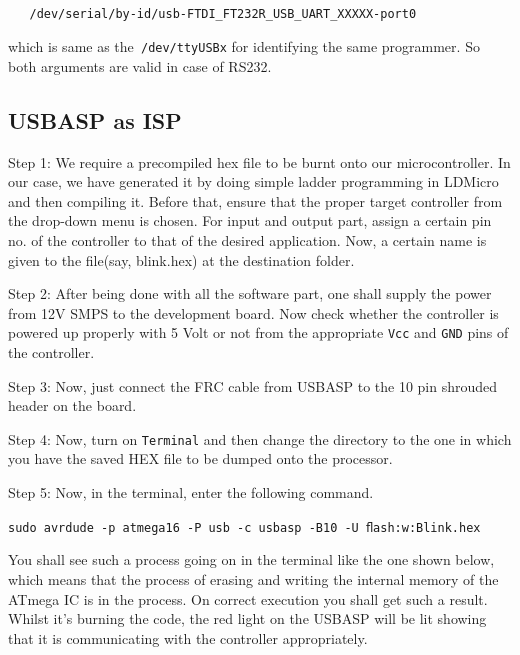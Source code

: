 \documentclass[12pt]{article}
\begin{document}
\begin{verbatim}

   /dev/serial/by-id/usb-FTDI_FT232R_USB_UART_XXXXX-port0

\end{verbatim}
which is same as the\texttt{ /dev/ttyUSBx} for identifying the same programmer. So both arguments are valid in case of RS232.
\newpage\subsection{USBASP as ISP}
Step 1: We require a precompiled hex file to be burnt onto our microcontroller. In our case, we have generated it by doing simple ladder programming in LDMicro and then compiling it. Before that, ensure that the proper target controller from the drop-down menu is chosen. For input and output part, assign a certain pin no. of the controller to that of the desired application. Now, a certain name is given to the file(say, blink.hex) at the destination folder.\vspace{12pt}

Step 2: After being done with all the software part, one shall supply the power from 12V SMPS to the development board. Now check whether the controller is powered up properly with 5 Volt or not from the appropriate \texttt{Vcc} and \texttt{GND} pins of the controller.
\vspace{12pt}


Step 3: Now, just connect the FRC cable from USBASP to the 10 pin shrouded header on the board. 
\vspace{12pt}

Step 4: Now, turn on \texttt{Terminal} and then change the directory to the one in which you have the saved HEX file to be dumped onto the processor.
\vspace{12pt}

Step 5: Now, in the terminal, enter the following command.

\texttt{sudo avrdude -p atmega16 -P usb -c usbasp -B10 -U ﬂash:w:Blink.hex}\vspace{12pt}

You shall see such a process going on in the terminal like the one shown below, which means that the process of erasing and writing the internal memory of the ATmega IC is in the process. On correct execution you shall get such a result. Whilst it's burning the code, the red light on the USBASP will be lit showing that it is communicating with the controller appropriately.
\end{document}
